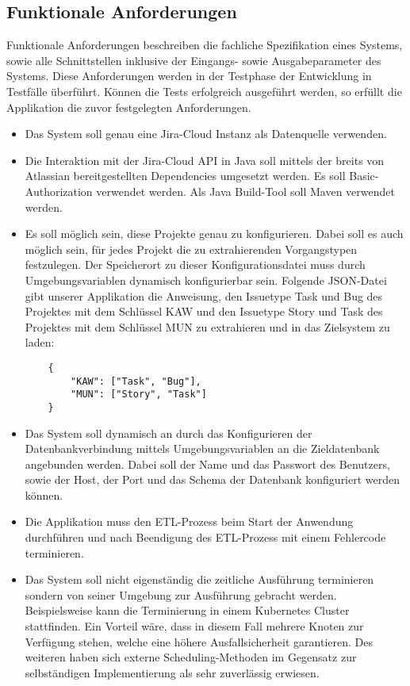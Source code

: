 \subsection{Funktionale Anforderungen}
Funktionale Anforderungen beschreiben die fachliche Spezifikation eines Systems, sowie alle Schnittstellen inklusive der Eingangs- sowie Ausgabeparameter des Systems. Diese Anforderungen werden in der Testphase der Entwicklung in Testfälle überführt. Können die Tests erfolgreich ausgeführt werden, so erfüllt die Applikation die zuvor festgelegten Anforderungen.\\
\begin{itemize}
  \item Das System soll genau eine Jira-Cloud Instanz als Datenquelle verwenden. 
  \item Die Interaktion mit der Jira-Cloud API in Java soll mittels der breits von Atlassian bereitgestellten Dependencies umgesetzt werden. Es soll Basic-Authorization verwendet werden. Als Java Build-Tool soll Maven verwendet werden.
  \item Es soll möglich sein, diese Projekte genau zu konfigurieren. Dabei soll es auch möglich sein, für jedes Projekt die zu extrahierenden Vorgangstypen festzulegen. Der Speicherort zu dieser Konfigurationsdatei muss durch Umgebungsvariablen dynamisch konfigurierbar sein. Folgende JSON-Datei gibt unserer Applikation die Anweisung, den Issuetype Task und Bug des Projektes mit dem Schlüssel KAW und den Issuetype Story und Task des Projektes mit dem Schlüssel MUN zu extrahieren und in das Zielsystem zu laden:
    \begin{lstlisting}
    {
        "KAW": ["Task", "Bug"],
        "MUN": ["Story", "Task"]
    }
    \end{lstlisting}
  \item Das System soll dynamisch an durch das Konfigurieren der Datenbankverbindung mittels Umgebungsvariablen an die Zieldatenbank angebunden werden. Dabei soll der Name und das Passwort des Benutzers, sowie der Host, der Port und das Schema der Datenbank konfiguriert werden können.
  \item Die Applikation muss den ETL-Prozess beim Start der Anwendung durchführen und nach Beendigung des ETL-Prozess mit einem Fehlercode terminieren.
  \item Das System soll nicht eigenständig die zeitliche Ausführung terminieren sondern von seiner Umgebung zur Ausführung gebracht werden. Beispielsweise kann die Terminierung in einem Kubernetes Cluster stattfinden. Ein Vorteil wäre, dass in diesem Fall mehrere Knoten zur Verfügung stehen, welche eine höhere Ausfallsicherheit garantieren. Des weiteren haben sich externe Scheduling-Methoden im Gegensatz zur selbständigen Implementierung als sehr zuverlässig erwiesen. \\

\end{itemize}
